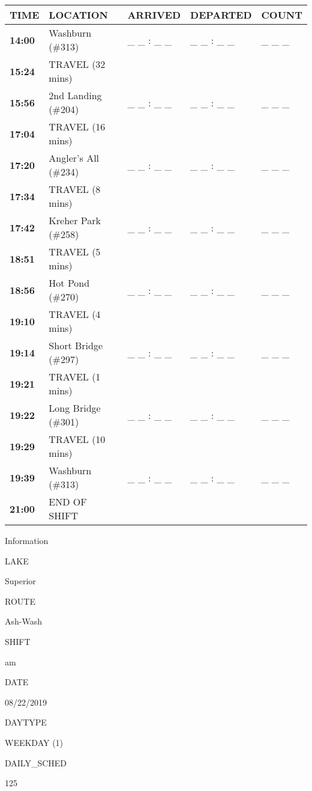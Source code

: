 \documentclass[]{article}
\begin{document}
\begin{tabular}{>{\bfseries}lllll}
\toprule
\textbf{TIME} & \textbf{LOCATION} & \textbf{ARRIVED} & \textbf{DEPARTED} & \textbf{COUNT}\\
\midrule
14:00 & Washburn (\#313) & \_ \_ : \_ \_ & \_ \_ : \_ \_ & \_ \_ \_\\
15:24 & TRAVEL (32 mins) &  &  & \\
15:56 & 2nd Landing (\#204) & \_ \_ : \_ \_ & \_ \_ : \_ \_ & \_ \_ \_\\
17:04 & TRAVEL (16 mins) &  &  & \\
17:20 & Angler's All (\#234) & \_ \_ : \_ \_ & \_ \_ : \_ \_ & \_ \_ \_\\
17:34 & TRAVEL (8 mins) &  &  & \\
17:42 & Kreher Park (\#258) & \_ \_ : \_ \_ & \_ \_ : \_ \_ & \_ \_ \_\\
18:51 & TRAVEL (5 mins) &  &  & \\
18:56 & Hot Pond (\#270) & \_ \_ : \_ \_ & \_ \_ : \_ \_ & \_ \_ \_\\
19:10 & TRAVEL (4 mins) &  &  & \\
19:14 & Short Bridge (\#297) & \_ \_ : \_ \_ & \_ \_ : \_ \_ & \_ \_ \_\\
19:21 & TRAVEL (1 mins) &  &  & \\
19:22 & Long Bridge (\#301) & \_ \_ : \_ \_ & \_ \_ : \_ \_ & \_ \_ \_\\
19:29 & TRAVEL (10 mins) &  &  & \\
19:39 & Washburn (\#313) & \_ \_ : \_ \_ & \_ \_ : \_ \_ & \_ \_ \_\\
21:00 & END OF SHIFT &  &  & \\
\bottomrule
\end{tabular}\newpage

Information

LAKE

Superior

ROUTE

Ash-Wash

SHIFT

am

DATE

08/22/2019

DAYTYPE

WEEKDAY (1)

DAILY\_SCHED

125

\vspace{24pt}
\end{document}
